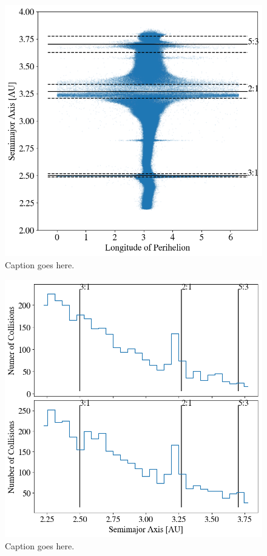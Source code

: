 \documentclass[twocolumn]{aastex63}
\begin{document}
\begin{figure}
    \includegraphics[width=\columnwidth]{figures/long_ph.png}
    \caption{Caption goes here.\label{fig:long_ph}}
\end{figure}

\begin{figure}
    \includegraphics[width=\columnwidth]{figures/coll_hist_a.png}
    \caption{Caption goes here.\label{fig:coll_hist_a}}
\end{figure}
\end{document}
